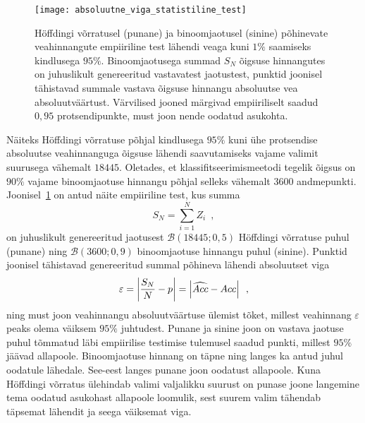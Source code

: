 \begin{figure}[H]
    \begin{center}
        \texttt{[image: absoluutne\_viga\_statistiline\_test]} 
    \end{center}
    \caption{Höffdingi võrratusel (punane) ja binoomjaotusel (sinine) põhinevate veahinnangute empiiriline test lähendi veaga kuni $1\%$ saamiseks kindlusega $95\%$. Binoomjaotusega summad $S_N$ õigsuse hinnangutes on juhuslikult genereeritud vastavatest jaotustest, punktid joonisel tähistavad summale vastava õigsuse hinnangu absoluutse vea absoluutväärtust. Värvilised jooned märgivad empiiriliselt saadud $0{,}95$ protsendipunkte, must joon nende oodatud asukohta.}
    \label{fig:höffding ja binoomjaotus absoluutne viga empiiriline test}
\end{figure}

Näiteks Höffdingi võrratuse põhjal kindlusega $95\%$ kuni ühe protsendise absoluutse veahinnanguga õigsuse lähendi saavutamiseks vajame valimit suurusega vähemalt $18445$. Oletades, et klassifitseerimismeetodi tegelik õigsus on $90\%$ vajame binoomjaotuse hinnangu põhjal selleks vähemalt $3600$ andmepunkti. Joonisel~\ref{fig:höffding ja binoomjaotus absoluutne viga empiiriline test} on antud näite empiiriline test, kus summa
\begin{equation*}
    S_N = \sum_{i = 1}^N Z_i \enspace,
\end{equation*}
on juhuslikult genereeritud jaotusest $\mathcal{B}(18445; 0{,}5)$ Höffdingi võrratuse puhul (punane) ning $\mathcal{B}(3600; 0{,}9)$ binoomjaotuse hinnangu puhul (sinine). Punktid joonisel tähistavad genereeritud summal põhineva lähendi absoluutset viga
\begin{equation*}
    \varepsilon = \left| \frac{S_N}{N} - p \right| = \left| \widehat{Acc} - Acc \right| \enspace,
\end{equation*}
ning must joon veahinnangu absoluutväärtuse ülemist tõket, millest veahinnang $\varepsilon$ peaks olema väiksem $95\%$ juhtudest. Punane ja sinine joon on vastava jaotuse puhul tõmmatud läbi empiirilise testimise tulemusel saadud punkti, millest $95\%$ jäävad allapoole. Binoomjaotuse hinnang on täpne ning langes ka antud juhul oodatule lähedale. See-eest langes punane joon oodatust allapoole. Kuna Höffdingi võrratus ülehindab valimi valjalikku suurust on punase joone langemine tema oodatud asukohast allapoole loomulik, sest suurem valim tähendab täpsemat lähendit ja seega väiksemat viga.